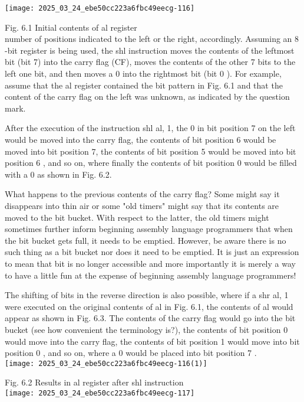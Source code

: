 \documentclass[10pt]{article}
\begin{document}
\begin{center}
\texttt{[image: 2025\_03\_24\_ebe50cc223a6fbc49eecg-116]}
\end{center}

Fig. 6.1 Initial contents of al register\\
number of positions indicated to the left or the right, accordingly. Assuming an 8 -bit register is being used, the shl instruction moves the contents of the leftmost bit (bit 7) into the carry flag (CF), moves the contents of the other 7 bits to the left one bit, and then moves a 0 into the rightmost bit (bit 0 ). For example, assume that the al register contained the bit pattern in Fig. 6.1 and that the content of the carry flag on the left was unknown, as indicated by the question mark.

After the execution of the instruction shl al, 1, the 0 in bit position 7 on the left would be moved into the carry flag, the contents of bit position 6 would be moved into bit position 7, the contents of bit position 5 would be moved into bit position 6 , and so on, where finally the contents of bit position 0 would be filled with a 0 as shown in Fig. 6.2.

What happens to the previous contents of the carry flag? Some might say it disappears into thin air or some "old timers" might say that its contents are moved to the bit bucket. With respect to the latter, the old timers might sometimes further inform beginning assembly language programmers that when the bit bucket gets full, it needs to be emptied. However, be aware there is no such thing as a bit bucket nor does it need to be emptied. It is just an expression to mean that bit is no longer accessible and more importantly it is merely a way to have a little fun at the expense of beginning assembly language programmers!

The shifting of bits in the reverse direction is also possible, where if a shr al, 1 were executed on the original contents of al in Fig. 6.1, the contents of al would appear as shown in Fig. 6.3. The contents of the carry flag would go into the bit bucket (see how convenient the terminology is?), the contents of bit position 0 would move into the carry flag, the contents of bit position 1 would move into bit position 0 , and so on, where a 0 would be placed into bit position 7 .\\
\texttt{[image: 2025\_03\_24\_ebe50cc223a6fbc49eecg-116(1)]}

Fig. 6.2 Results in al register after shl instruction\\
\texttt{[image: 2025\_03\_24\_ebe50cc223a6fbc49eecg-117]}
\end{document}
